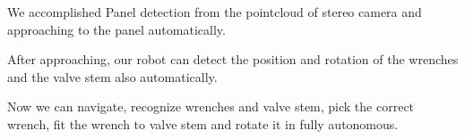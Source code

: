 We accomplished Panel detection from the pointcloud of stereo camera and approaching to the panel automatically.

After approaching, our robot can detect the position and rotation of the wrenches and the valve stem also automatically.

Now we can navigate, recognize wrenches and valve stem, pick the correct wrench, fit the wrench to valve stem and rotate it in fully autonomous.
